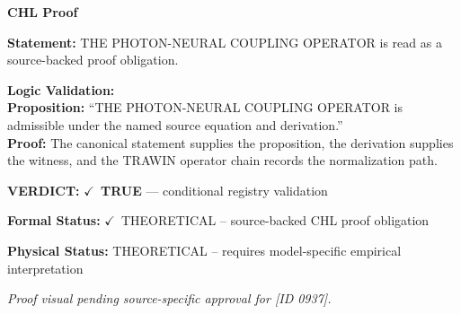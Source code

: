 \vspace{0.45em}
\noindent\textbf{CHL Proof}\par
\textbf{Statement:} THE PHOTON-NEURAL COUPLING OPERATOR is read as a source-backed proof obligation.

\textbf{Logic Validation:}\\
\textbf{Proposition:} ``THE PHOTON-NEURAL COUPLING OPERATOR is admissible under the named source equation and derivation.''\\
\textbf{Proof:} The canonical statement supplies the proposition, the derivation supplies the witness, and the TRAWIN operator chain records the normalization path.

\textbf{VERDICT:} \ensuremath{\checkmark}\ \textbf{TRUE} --- conditional registry validation

\textbf{Formal Status:} \ensuremath{\checkmark}\ THEORETICAL -- source-backed CHL proof obligation

\textbf{Physical Status:} THEORETICAL -- requires model-specific empirical interpretation
\par\vspace{0.45em}
\par
\vfill
\begingroup\footnotesize\itshape
Proof visual pending source-specific approval for [ID 0937].
\par\endgroup
\vfill
\endgroup
\endgroup

